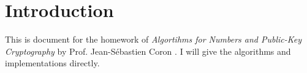 \section{Introduction}
This is document for the homework of 
\textsl{Algortihms for Numbers and Public-Key
Cryptography} \cite{jscoroncrypto} by Prof. Jean-S\'ebastien Coron \cite{jscoron}.
I will give the algorithms and implementations directly.
